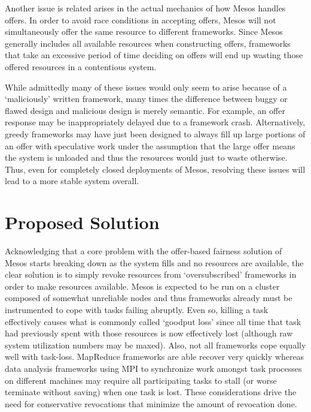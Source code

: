 Another issue is related arises in the actual mechanics of how Mesos handles offers. In order
to avoid race conditions in accepting offers, Mesos will not simultaneously offer the same
resource to different frameworks. Since Mesos generally includes all available resources when
constructing offers, frameworks that take an excessive period of time deciding on offers will
end up wasting those offered resources in a contentious system.

While admittedly many of these issues would only seem to arise because of a `maliciously'
written framework, many times the difference between buggy or flawed design and malicious
design is merely semantic. For example, an offer response may be inappropriately delayed due to
a framework crash. Alternatively, greedy frameworks may have just been designed to always fill
up large portions of an offer with speculative work under the assumption that the large offer
means the system is unloaded and thus the resources would just to waste otherwise. Thus, even
for completely closed deployments of Mesos, resolving these issues will lead to a more stable
system overall. 

\section{Proposed Solution}
Acknowledging that a core problem with the offer-based fairness solution of Mesos starts
breaking down as the system fills and no resources are available, the clear solution is to
simply revoke resources from `oversubscribed' frameworks in order to make resources available.
Mesos is expected to be run on a cluster composed of somewhat unreliable nodes and thus
frameworks already must be instrumented to cope with tasks failing abruptly. Even so, killing a
task effectively causes what is commonly called `goodput loss' since all time that task had
previously spent with those resources is now effectively lost (although raw system utilization
numbers may be maxed). Also, not all frameworks cope equally well with task-loss. MapReduce
frameworks are able recover very quickly whereas data analysis frameworks using MPI to
synchronize work amongst task processes on different machines may require all participating
tasks to stall (or worse terminate without saving) when one task is lost. These considerations
drive the need for conservative revocations that minimize the amount of revocation done.

